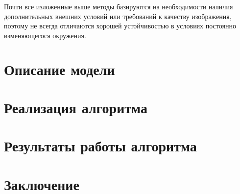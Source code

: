 \documentclass[12pt]{article} %
\begin{document}
Почти все изложенные выше методы базируются на необходимости наличия дополнительных внешних условий или требований к качеству изображения, поэтому не всегда отличаются хорошей устойчивостью в условиях постоянно изменяющегося окружения. 


\newpage
\section{Описание модели}




\newpage
\section{Реализация алгоритма}




\newpage
\section{Результаты работы алгоритма}





\newpage
\section{Заключение}




\newpage



\nocite{Yang}
\end{document}
